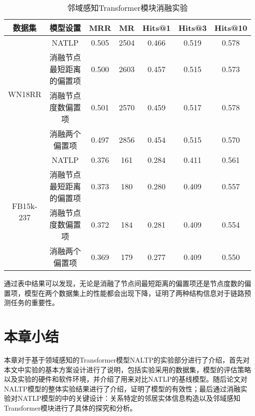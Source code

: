 \begin{table}[htbp]
  \begin{center}
      \caption{邻域感知Transformer模块消融实验}
      \setlength{\tabcolsep}{8pt}
      \renewcommand\arraystretch{1.5}
      \begin{tabular}{*{7}{c}}
          \toprule
          数据集 & 模型设置 & MRR&MR&Hits@1&Hits@3&	Hits@10\\
          \midrule
          \multirow{4}{*}{WN18RR}&NATLP&0.505&2504&0.466&0.519&0.578\\
          &消融节点最短距离的偏置项&0.500&2603&0.457&0.515&0.573\\
          &消融节点度数偏置项&0.501&2570&0.459&0.517&0.578\\
          &消融两个偏置项&0.497&2856&0.454&0.515&0.570\\
          \cmidrule{1-7}
          \multirow{4}{*}{FB15k-237}&NATLP&0.376&161&0.284&0.411&0.561\\
          &消融节点最短距离的偏置项&0.373&180&0.280&0.409&0.557\\
          &消融节点度数偏置项&0.372&184&0.281&0.409&0.554\\
          &消融两个偏置项&0.369&179&0.277&0.409&0.550\\
          \bottomrule
      \end{tabular}
      \label{NATLP_ablation2}
  \end{center}
\end{table}

通过表中结果可以发现，无论是消融了节点间最短距离的偏置项还是节点度数的偏置项，模型在两个数据集上的性能都会出现下降，证明了两种结构信息对于链路预测任务的重要性。


\section{本章小结}

本章对于基于领域感知的Transformer模型NALTP的实验部分进行了介绍，首先对本文中实验的基本方案设计进行了说明，包括实验采用的数据集，模型的评估策略以及实验的硬件和软件环境，并介绍了用来对比NATLP的基线模型。随后论文对NALTP模型的整体实验结果进行了介绍，证明了模型的有效性；最后通过消融实验对NATLP模型的中的关键设计：关系特定的邻居实体信息构造以及邻域感知Transformer模块进行了具体的探究和分析。